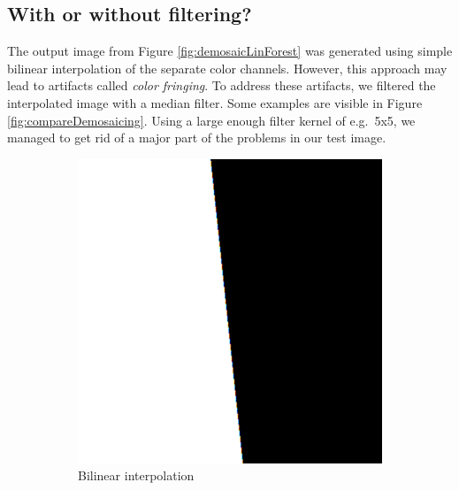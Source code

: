 \documentclass[a4paper]{article}
\begin{document}
\subsection*{With or without filtering?}
The output image from Figure \ref{fig:demosaicLinForest} was generated using simple bilinear interpolation of the separate color channels. However, this approach may lead to artifacts called \emph{color fringing}. To address these artifacts, we filtered the interpolated image with a median filter. Some examples are visible in Figure \ref{fig:compareDemosaicing}. 
Using a large enough filter kernel of e.g.\ 5x5, we managed to get rid of a major part of the problems in our test image.
\begin{figure}[H]
	\centering
	\begin{subfigure}[h]{0.48\textwidth}
		\centering
		\includegraphics[width=\textwidth]{black_and_white_bilinear_interpolated}
		\caption*{Bilinear interpolation}
	\end{subfigure}
	~
	\begin{subfigure}[h]{0.48\textwidth}
		\centering

\end{subfigure}
\end{figure}
\end{document}
